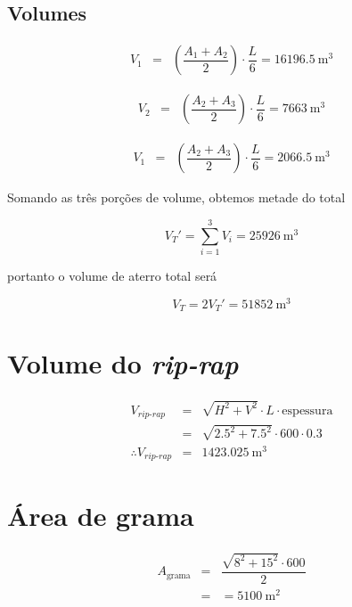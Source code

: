 \documentclass[a4paper, 12pt, brazilian]{article}
\begin{document}
	\subsection{Volumes}
	
	\begin{eqnarray}
		V_{1}&=&\left(\dfrac{A_{1}+A_{2}}{2}\right)\cdot\dfrac{L}{6}=\SI{16196.5}{\meter^{3}}
	\end{eqnarray}
	
	\begin{eqnarray}
		V_{2}&=&\left(\dfrac{A_{2}+A_{3}}{2}\right)\cdot\dfrac{L}{6}=\SI{7663}{\meter^{3}}	
	\end{eqnarray}
	
	\begin{eqnarray}
		V_{1}&=&\left(\dfrac{A_{2}+A_{3}}{2}\right)\cdot\dfrac{L}{6}=\SI{2066.5}{\meter^{3}}
	\end{eqnarray}
	
	Somando as três porções de volume, obtemos metade do total
	
	\begin{equation}
		V_{T}'=\sum\limits_{i=1}^{3}V_{i}=\SI{25926}{\meter^{3}}
	\end{equation}
	
	portanto o volume de aterro total será 
	
	\begin{equation}
		V_{T}=2V_{T}'=\SI{51852}{\meter^{3}}
	\end{equation}
	
	\section{Volume do \textit{rip-rap}}
	
	\begin{eqnarray}
		V_{\textit{rip-rap}}&=&\sqrt{H^{2}+V^{2}}\cdot L\cdot\textrm{espessura}\\
		&=&\sqrt{2.5^{2}+7.5^{2}}\cdot 600\cdot 0.3\\
		\therefore V_{\textit{rip-rap}}&=&\SI{1423.025}{\meter^{3}}
	\end{eqnarray}
	
	\section{Área de grama}
	
	\begin{eqnarray}
		A_{\textrm{grama}}&=&\dfrac{\sqrt{8^{2}+15^{2}}\cdot 600}{2}\\
		&=&=\SI{5100}{\meter^{2}}
	\end{eqnarray}
	
\end{document}
